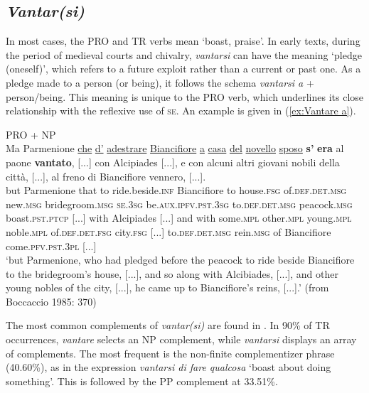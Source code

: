 \documentclass[output=paper,colorlinks,citecolor=brown]{langscibook}
\begin{document}
\subsection{\textit{Vantar(si)}}

In most cases, the PRO and TR verbs mean ‘boast, praise’. In early texts, during the period of medieval courts and chivalry, \textit{vantarsi} can have the meaning ‘pledge (oneself)’, which refers to a future exploit rather than a current or past one. As a pledge made to a person (or being), it follows the schema \textit{vantarsi a} + person/being. This meaning is unique to the PRO verb, which underlines its close relationship with the reflexive use of \textsc{se}. An example is given in (\ref{ex:Vantare a}).

\begin{exe}
\ex PRO + NP \\ \label{ex:Vantare a}
    \gll Ma Parmenione \ul{che} \ul{d'} \ul{adestrare} \ul{Biancifiore} \ul{a} \ul{casa} \ul{del} \ul{novello} \ul{sposo} \textbf{s'} \textbf{era} al paone \textbf{vantato}, [...] con Alcipiades [...], e con alcuni altri giovani nobili della città, [...], al freno di Biancifiore vennero, [...].\\
    but Parmenione that to ride.beside.\textsc{inf} Biancifiore to house.\textsc{fsg} of.\textsc{def.det.msg} new.\textsc{msg} bridegroom.\textsc{msg} \textsc{se}.\textsc{3sg} be.\textsc{aux.ipfv.pst.3sg} to.\textsc{def.det.msg} peacock.\textsc{msg} boast.\textsc{pst.ptcp} [...] with Alcipiades [...] and with some.\textsc{mpl} other.\textsc{mpl} young.\textsc{mpl} noble.\textsc{mpl} of.\textsc{def.det.fsg} city.\textsc{fsg} [...] to.\textsc{def.det.msg} rein.\textsc{msg} of Biancifiore come.\textsc{pfv.pst.3pl} [...]\\ 
    \glt ‘but Parmenione, who had pledged before the peacock to ride beside Biancifiore to the bridegroom's house, [...], and so along with Alcibiades, [...], and other young nobles of the city, [...], he came up to Biancifiore's reins, [...].’ (from Boccaccio 1985: 370)
\end{exe}

The most common complements of \textit{vantar(si)} are found in . In 90\% of TR occurrences, \textit{vantare} selects an NP complement, while \textit{vantarsi} displays an array of complements. The most frequent is the non-finite complementizer phrase (40.60\%), as in the expression \textit{vantarsi di fare qualcosa} ‘boast about doing something’. This is followed by the PP complement at 33.51\%.
\end{document}

